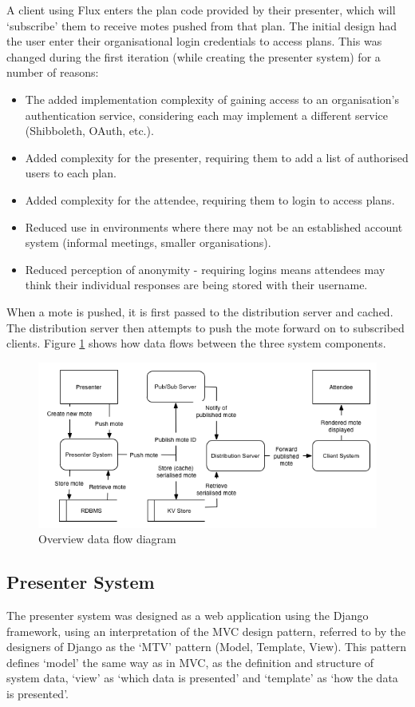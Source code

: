 \documentclass[a4papert,11pt,notitlepage]{ltxdoc}
\begin{document}
A client using Flux enters the plan code provided by their presenter, which will `subscribe' them to receive motes pushed from that plan. The initial design had the user enter their organisational login credentials to access plans. This was changed during the first iteration (while creating the presenter system) for a number of reasons:
\begin{itemize}
\item The added implementation complexity of gaining access to an organisation's authentication service, considering each may implement a different service (Shibboleth, OAuth, etc.).
\item Added complexity for the presenter, requiring them to add a list of authorised users to each plan.
\item Added complexity for the attendee, requiring them to login to access plans.
\item Reduced use in environments where there may not be an established account system (informal meetings, smaller organisations).
\item Reduced perception of anonymity - requiring logins means attendees may think their individual responses are being stored with their username.
\end{itemize}

When a mote is pushed, it is first passed to the distribution server and cached. The distribution server then attempts to push the mote forward on to subscribed clients. Figure \ref{fig:dfd} shows how data flows between the three system components.

\begin{figure}
\caption{Overview data flow diagram}
\label{fig:dfd}
\centering
\includegraphics[width=1\textwidth]{dfd}
\end{figure}

\subsection{Presenter System}
The presenter system was designed as a web application using the Django framework, using an interpretation of the MVC design pattern, referred to by the designers of Django as the `MTV' pattern (Model, Template, View). This pattern defines `model' the same way as in MVC, as the definition and structure of system data, `view' as `which data is presented' and `template' as `how the data is presented'\cite{djangomvcfaq:web}.
\end{document}
